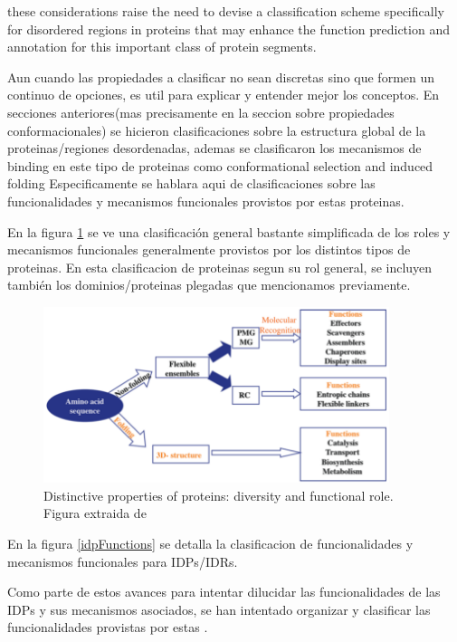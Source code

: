 these
considerations raise the need to devise a classification scheme
specifically for disordered regions in proteins that may enhance
the function prediction and annotation for this important class of
protein segments.

Aun cuando las propiedades a clasificar no sean discretas sino que formen un continuo de opciones, es util para explicar y entender mejor los conceptos.
En secciones anteriores(mas precisamente en la seccion sobre propiedades conformacionales) se hicieron clasificaciones sobre la estructura global de la proteinas/regiones desordenadas, 
ademas se clasificaron los mecanismos de binding en este tipo de proteinas como conformational selection and induced folding
Especificamente se hablara aqui de clasificaciones sobre las funcionalidades y mecanismos funcionales provistos por estas proteinas.

En la figura \ref{proteinMechanisms} se ve una clasificación general bastante simplificada de los roles y mecanismos funcionales generalmente provistos por los distintos tipos de proteinas. 
En esta clasificacion de proteinas segun su rol general, se incluyen también los dominios/proteinas plegadas que mencionamos previamente.

\begin{figure}[h!,centered]
\centering
\includegraphics[width=0.9\textwidth]{img/proteinFunctionMechanisms.png} 
\caption{Distinctive properties of proteins: diversity and functional role. Figura extraida de \cite{habchi2014introducing} }
\label{proteinMechanisms}
\end{figure}


En la figura \ref{idpFunctions} se detalla la clasificacion de funcionalidades y mecanismos funcionales para IDPs/IDRs.


Como parte de estos avances para intentar dilucidar las funcionalidades de las IDPs y sus mecanismos asociados, se han intentado organizar y clasificar las funcionalidades provistas por estas \cite{van2014classification}.


